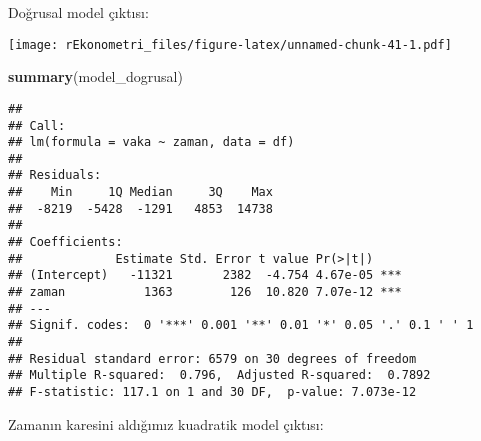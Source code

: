 \documentclass[
]{book}
\newenvironment{Shaded}{\begin{snugshade}}{\end{snugshade}}
\newcommand{\DataTypeTok}[1]{\textcolor[rgb]{0.13,0.29,0.53}{#1}}
\newcommand{\DecValTok}[1]{\textcolor[rgb]{0.00,0.00,0.81}{#1}}
\newcommand{\KeywordTok}[1]{\textcolor[rgb]{0.13,0.29,0.53}{\textbf{#1}}}
\newcommand{\NormalTok}[1]{#1}
\newcommand{\OperatorTok}[1]{\textcolor[rgb]{0.81,0.36,0.00}{\textbf{#1}}}
\newcommand{\StringTok}[1]{\textcolor[rgb]{0.31,0.60,0.02}{#1}}
\begin{document}
Doğrusal model çıktısı:

\begin{Shaded}
\end{Shaded}

\texttt{[image: rEkonometri\_files/figure-latex/unnamed-chunk-41-1.pdf]}

\begin{Shaded}
\begin{Highlighting}[]
\KeywordTok{summary}\NormalTok{(model_dogrusal)}
\end{Highlighting}
\end{Shaded}

\begin{verbatim}
## 
## Call:
## lm(formula = vaka ~ zaman, data = df)
## 
## Residuals:
##    Min     1Q Median     3Q    Max 
##  -8219  -5428  -1291   4853  14738 
## 
## Coefficients:
##             Estimate Std. Error t value Pr(>|t|)    
## (Intercept)   -11321       2382  -4.754 4.67e-05 ***
## zaman           1363        126  10.820 7.07e-12 ***
## ---
## Signif. codes:  0 '***' 0.001 '**' 0.01 '*' 0.05 '.' 0.1 ' ' 1
## 
## Residual standard error: 6579 on 30 degrees of freedom
## Multiple R-squared:  0.796,  Adjusted R-squared:  0.7892 
## F-statistic: 117.1 on 1 and 30 DF,  p-value: 7.073e-12
\end{verbatim}

Zamanın karesini aldığımız kuadratik model çıktısı:
\end{document}
